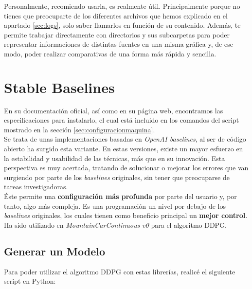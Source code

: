 \documentclass[11pt,fleqn]{book} %
\begin{document}
Personalmente, recomiendo usarla, es realmente útil. Principalmente porque no tienes que preocuparte de los diferentes archivos que hemos explicado en el apartado \ref{sec:logs}, solo saber llamarlos en función de su contenido. Además, te permite trabajar directamente con directorios y sus subcarpetas para poder representar informaciones de distintas fuentes en una misma gráfica y, de ese modo, poder realizar comparativas de una forma más rápida y sencilla.

\chapter{Stable Baselines}\label{sec:stablebaselines}

En su documentación oficial\cite{book:stablebaselines}, así como en su página web\cite{article:stablebaselines}, encontramos las especificaciones para instalarlo, el cual está incluido en los comandos del script mostrado en la sección \ref{sec:configuracionmaquina}. \\

Se trata de unas implementaciones basadas en \textit{OpenAI baselines}, al ser de código abierto ha surgido esta variante. En estas versiones, existe un mayor esfuerzo en la estabilidad y usabilidad de las técnicas, más que en su innovación. Esta perspectiva es muy acertada, tratando de solucionar o mejorar los errores que van surgiendo por parte de los \textit{baselines} originales, sin tener que preocuparse de tareas investigadoras. \\

Éste permite una \textbf{configuración más profunda} por parte del usuario y, por tanto, algo más compleja. Es una programación un nivel por debajo de los \textit{baselines} originales, los cuales tienen como beneficio principal un \textbf{mejor control}. Ha sido utilizado en \textit{MountainCarContinuous-v0} para el algoritmo DDPG. \\

\section{Generar un Modelo}

Para poder utilizar el algoritmo DDPG con estas librerías, realicé el siguiente script en Python:\\
\end{document}
